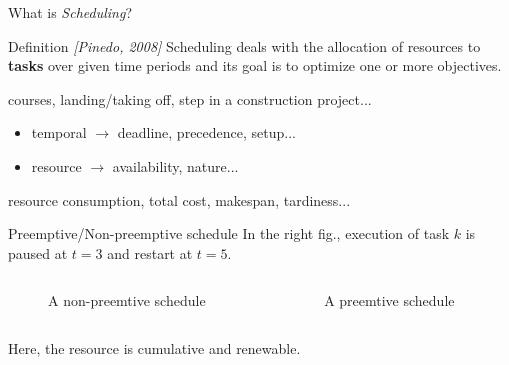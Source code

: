 \begin{frame}{What is {\it Scheduling}?}
  \vspace{0.3cm}
  \begin{block}{Definition {\small \it \color{blue!50!black!50}[Pinedo, 2008]}}
    Scheduling deals with the allocation of resources to {\bf tasks} over
    given time periods and its goal is to optimize one or more objectives.
  \end{block}
  \vspace{0.6cm}
  \begin{description}[constraints :]
    \pause
  \item[tasks :]  courses, landing/taking off, step in a
    construction project... 
    \vspace{0.2cm}
    \pause
  \item[constraints :]
    \begin{itemize}
    \item temporal $\rightarrow$ deadline, precedence, setup...
    \item resource $\rightarrow$ availability, nature... 
    \end{itemize}
    \pause
    \vspace{0.2cm}
  \item[objective :] resource consumption, total cost, makespan,
    tardiness... 
    \vspace{0.2cm}
  \end{description}
  \vfill
\end{frame}

\begin{frame}{Preemptive/Non-preemptive schedule}
  In the right fig., execution of task $k$ is paused at $t=3$ and
  restart at $t=5$.
  \vspace{-1.8cm}
  \begin{columns}
    \begin{column}{0.45\linewidth}
      \vspace{0.4cm}
      \begin{figure}[!htb]
        \centering
        
        \caption{A non-preemtive schedule}
      \end{figure}
    \end{column}
    \hfill
    \begin{column}{0.45\linewidth}
      \begin{figure}[!htb]
        \centering
        
        \caption{A preemtive schedule}
      \end{figure}
    \end{column}
  \end{columns} 
  \begin{block}{}
    Here, the resource is cumulative and renewable. 
  \end{block}
\end{frame}

